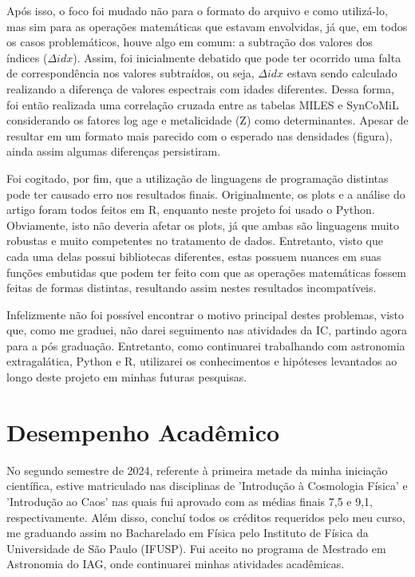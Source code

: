 \documentclass[12pt]{projeto}
\begin{document}
Após isso, o foco foi mudado não para o formato do arquivo e como utilizá-lo, mas sim para as operações matemáticas que estavam envolvidas, já que, em todos os casos problemáticos, houve algo em comum: a subtração dos valores dos índices (\(\Delta idx\)). Assim, foi inicialmente debatido que pode ter ocorrido uma falta de correspondência nos valores subtraídos, ou seja, \(\Delta idx\) estava sendo calculado realizando a diferença de valores espectrais com idades diferentes. Dessa forma, foi então realizada uma correlação cruzada entre as tabelas MILES e SynCoMiL considerando os fatores log age e metalicidade (Z) como determinantes. Apesar de resultar em um formato mais parecido com o esperado nas densidades (figura), ainda assim algumas diferenças persistiram.

Foi cogitado, por fim, que a utilização de linguagens de programação distintas pode ter causado erro nos resultados finais. Originalmente, os plots e a análise do artigo foram todos feitos em R, enquanto neste projeto foi usado o Python. Obviamente, isto não deveria afetar os plots, já que ambas são linguagens muito robustas e muito competentes no tratamento de dados. Entretanto, visto que cada uma delas possui bibliotecas diferentes, estas possuem nuances em suas funções embutidas que podem ter feito com que as operações matemáticas fossem feitas de formas distintas, resultando assim nestes resultados incompatíveis.

Infelizmente não foi possível encontrar o motivo principal destes problemas, visto que, como me graduei, não darei seguimento nas atividades da IC, partindo agora para a pós graduação. Entretanto, como continuarei trabalhando com astronomia extragalática, Python e R, utilizarei os conhecimentos e hipóteses levantados ao longo deste projeto em minhas futuras pesquisas. 

\section{Desempenho Acadêmico}
No segundo semestre de 2024, referente à primeira metade da minha iniciação científica, estive matriculado nas disciplinas de 'Introdução à Cosmologia Física' e 'Introdução ao Caos' nas quais fui aprovado com as médias finais 7,5 e 9,1, respectivamente. Além disso, concluí todos os créditos requeridos pelo meu curso, me graduando assim no Bacharelado em Física pelo Instituto de Física da Universidade de São Paulo (IFUSP). Fui aceito no programa de Mestrado em Astronomia do IAG, onde continuarei minhas atividades acadêmicas.
\end{document}

